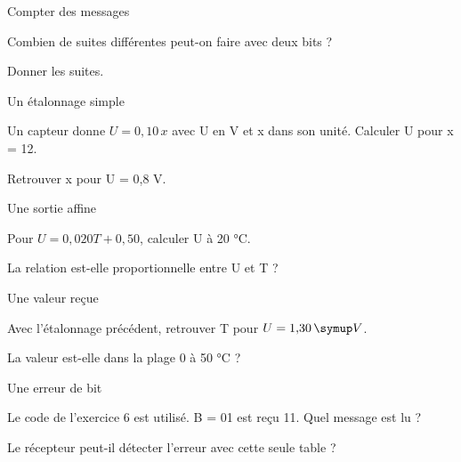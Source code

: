 \par\noindent\begin{minipage}{\linewidth}
\begin{exercice}[2]{Compter des messages}
\begin{questions}
\item Combien de suites différentes peut-on faire avec deux bits ?
\item Donner les suites.
\end{questions}
\end{exercice}
\end{minipage}
\par\noindent\begin{minipage}{\linewidth}
\begin{exercice}[2]{Un étalonnage simple}
\begin{questions}
\item Un capteur donne $U=0{,}10\,x$ avec U en V et x dans son unité. Calculer U pour x = 12.
\item Retrouver x pour U = 0,8 V.
\end{questions}
\end{exercice}
\end{minipage}
\par\noindent\begin{minipage}{\linewidth}
\begin{exercice}[2]{Une sortie affine}
\begin{questions}
\item Pour $U=0{,}020T+0{,}50$, calculer U à 20 °C.
\item La relation est-elle proportionnelle entre U et T ?
\end{questions}
\end{exercice}
\end{minipage}
\par\noindent\begin{minipage}{\linewidth}
\begin{exercice}[2]{Une valeur reçue}
\begin{questions}
\item Avec l’étalonnage précédent, retrouver T pour $U=1{,}30\unite V$.
\item La valeur est-elle dans la plage 0 à 50 °C ?
\end{questions}
\end{exercice}
\end{minipage}
\clearpage{}
\par\noindent\begin{minipage}{\linewidth}
\begin{exercice}[3]{Une erreur de bit}
\begin{questions}
\item Le code de l’exercice 6 est utilisé. B = 01 est reçu 11. Quel message est lu ?
\item Le récepteur peut-il détecter l’erreur avec cette seule table ?
\end{questions}
\end{exercice}
\end{minipage}
